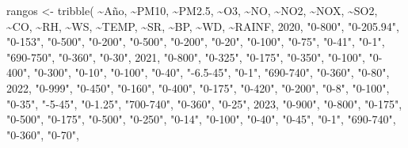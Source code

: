 \documentclass[
  letterpaper,
  DIV=11,
  numbers=noendperiod]{scrartcl}
\newenvironment{Shaded}{\begin{snugshade}}{\end{snugshade}}
\newcommand{\DecValTok}[1]{\textcolor[rgb]{0.68,0.00,0.00}{#1}}
\newcommand{\FloatTok}[1]{\textcolor[rgb]{0.68,0.00,0.00}{#1}}
\newcommand{\FunctionTok}[1]{\textcolor[rgb]{0.28,0.35,0.67}{#1}}
\newcommand{\NormalTok}[1]{\textcolor[rgb]{0.00,0.23,0.31}{#1}}
\newcommand{\OtherTok}[1]{\textcolor[rgb]{0.00,0.23,0.31}{#1}}
\newcommand{\SpecialCharTok}[1]{\textcolor[rgb]{0.37,0.37,0.37}{#1}}
\newcommand{\StringTok}[1]{\textcolor[rgb]{0.13,0.47,0.30}{#1}}
\begin{document}
\begin{Shaded}
\begin{Highlighting}[]
\NormalTok{rangos }\OtherTok{\textless{}{-}} \FunctionTok{tribble}\NormalTok{(}
  \SpecialCharTok{\textasciitilde{}}\NormalTok{Año, }\SpecialCharTok{\textasciitilde{}}\NormalTok{PM10, }\SpecialCharTok{\textasciitilde{}}\NormalTok{PM2}\FloatTok{.5}\NormalTok{, }\SpecialCharTok{\textasciitilde{}}\NormalTok{O3, }\SpecialCharTok{\textasciitilde{}}\NormalTok{NO, }\SpecialCharTok{\textasciitilde{}}\NormalTok{NO2, }\SpecialCharTok{\textasciitilde{}}\NormalTok{NOX, }\SpecialCharTok{\textasciitilde{}}\NormalTok{SO2, }\SpecialCharTok{\textasciitilde{}}\NormalTok{CO, }\SpecialCharTok{\textasciitilde{}}\NormalTok{RH, }\SpecialCharTok{\textasciitilde{}}\NormalTok{WS, }\SpecialCharTok{\textasciitilde{}}\NormalTok{TEMP, }\SpecialCharTok{\textasciitilde{}}\NormalTok{SR, }\SpecialCharTok{\textasciitilde{}}\NormalTok{BP, }\SpecialCharTok{\textasciitilde{}}\NormalTok{WD, }\SpecialCharTok{\textasciitilde{}}\NormalTok{RAINF,}
  \DecValTok{2020}\NormalTok{, }\StringTok{"0{-}800"}\NormalTok{, }\StringTok{"0{-}205.94"}\NormalTok{, }\StringTok{"0{-}153"}\NormalTok{, }\StringTok{"0{-}500"}\NormalTok{, }\StringTok{"0{-}200"}\NormalTok{, }\StringTok{"0{-}500"}\NormalTok{, }\StringTok{"0{-}200"}\NormalTok{, }\StringTok{"0{-}20"}\NormalTok{, }\StringTok{"0{-}100"}\NormalTok{, }\StringTok{"0{-}75"}\NormalTok{, }\StringTok{"0{-}41"}\NormalTok{, }\StringTok{"0{-}1"}\NormalTok{, }\StringTok{"690{-}750"}\NormalTok{, }\StringTok{"0{-}360"}\NormalTok{, }\StringTok{"0{-}30"}\NormalTok{,}
  \DecValTok{2021}\NormalTok{, }\StringTok{"0{-}800"}\NormalTok{, }\StringTok{"0{-}325"}\NormalTok{, }\StringTok{"0{-}175"}\NormalTok{, }\StringTok{"0{-}350"}\NormalTok{, }\StringTok{"0{-}100"}\NormalTok{, }\StringTok{"0{-}400"}\NormalTok{, }\StringTok{"0{-}300"}\NormalTok{, }\StringTok{"0{-}10"}\NormalTok{, }\StringTok{"0{-}100"}\NormalTok{, }\StringTok{"0{-}40"}\NormalTok{, }\StringTok{"{-}6.5{-}45"}\NormalTok{, }\StringTok{"0{-}1"}\NormalTok{, }\StringTok{"690{-}740"}\NormalTok{, }\StringTok{"0{-}360"}\NormalTok{, }\StringTok{"0{-}80"}\NormalTok{,}
  \DecValTok{2022}\NormalTok{, }\StringTok{"0{-}999"}\NormalTok{, }\StringTok{"0{-}450"}\NormalTok{, }\StringTok{"0{-}160"}\NormalTok{, }\StringTok{"0{-}400"}\NormalTok{, }\StringTok{"0{-}175"}\NormalTok{, }\StringTok{"0{-}420"}\NormalTok{, }\StringTok{"0{-}200"}\NormalTok{, }\StringTok{"0{-}8"}\NormalTok{, }\StringTok{"0{-}100"}\NormalTok{, }\StringTok{"0{-}35"}\NormalTok{, }\StringTok{"{-}5{-}45"}\NormalTok{, }\StringTok{"0{-}1.25"}\NormalTok{, }\StringTok{"700{-}740"}\NormalTok{, }\StringTok{"0{-}360"}\NormalTok{, }\StringTok{"0{-}25"}\NormalTok{,}
  \DecValTok{2023}\NormalTok{, }\StringTok{"0{-}900"}\NormalTok{, }\StringTok{"0{-}800"}\NormalTok{, }\StringTok{"0{-}175"}\NormalTok{, }\StringTok{"0{-}500"}\NormalTok{, }\StringTok{"0{-}175"}\NormalTok{, }\StringTok{"0{-}500"}\NormalTok{, }\StringTok{"0{-}250"}\NormalTok{, }\StringTok{"0{-}14"}\NormalTok{, }\StringTok{"0{-}100"}\NormalTok{, }\StringTok{"0{-}40"}\NormalTok{, }\StringTok{"0{-}45"}\NormalTok{, }\StringTok{"0{-}1"}\NormalTok{, }\StringTok{"690{-}740"}\NormalTok{, }\StringTok{"0{-}360"}\NormalTok{, }\StringTok{"0{-}70"}\NormalTok{,}

\end{Highlighting}
\end{Shaded}
\end{document}
